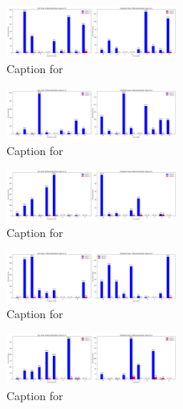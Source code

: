 \documentclass[12pt, a4paper]{article}
\begin{document}
\begin{figure}[ht]
\centering
\includegraphics[width=0.5\textwidth]{combined_class_boundary_pgd/combined_class_4_misclassifications_eps_0.3.png}
\caption{Caption for }
\label{fig:combined_class_4_misclassifications_eps_0.3.png}
\end{figure}

\begin{figure}[ht]
\centering
\includegraphics[width=0.5\textwidth]{combined_class_boundary_pgd/combined_class_5_misclassifications_eps_0.3.png}
\caption{Caption for }
\label{fig:combined_class_5_misclassifications_eps_0.3.png}
\end{figure}

\begin{figure}[ht]
\centering
\includegraphics[width=0.5\textwidth]{combined_class_boundary_pgd/combined_class_6_misclassifications_eps_0.3.png}
\caption{Caption for }
\label{fig:combined_class_6_misclassifications_eps_0.3.png}
\end{figure}

\begin{figure}[ht]
\centering
\includegraphics[width=0.5\textwidth]{combined_class_boundary_pgd/combined_class_7_misclassifications_eps_0.3.png}
\caption{Caption for }
\label{fig:combined_class_7_misclassifications_eps_0.3.png}
\end{figure}

\begin{figure}[ht]
\centering
\includegraphics[width=0.5\textwidth]{combined_class_boundary_pgd/combined_class_9_misclassifications_eps_0.3.png}
\caption{Caption for }
\label{fig:combined_class_9_misclassifications_eps_0.3.png}
\end{figure}
\end{document}
